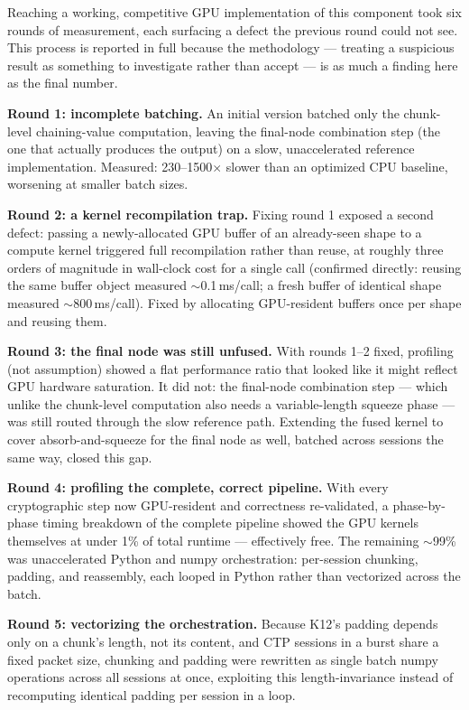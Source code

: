 \documentclass[twocolumn,10pt,journal,compsoc]{IEEEtran}
\begin{document}
Reaching a working, competitive GPU implementation of this component took six rounds of measurement, each surfacing a defect the previous round could not see. This process is reported in full because the methodology --- treating a suspicious result as something to investigate rather than accept --- is as much a finding here as the final number.

\textbf{Round 1: incomplete batching.} An initial version batched only the chunk-level chaining-value computation, leaving the final-node combination step (the one that actually produces the output) on a slow, unaccelerated reference implementation. Measured: 230--1500$\times$ slower than an optimized CPU baseline, worsening at smaller batch sizes.

\textbf{Round 2: a kernel recompilation trap.} Fixing round 1 exposed a second defect: passing a newly-allocated GPU buffer of an already-seen shape to a compute kernel triggered full recompilation rather than reuse, at roughly three orders of magnitude in wall-clock cost for a single call (confirmed directly: reusing the same buffer object measured $\sim$0.1\,ms/call; a fresh buffer of identical shape measured $\sim$800\,ms/call). Fixed by allocating GPU-resident buffers once per shape and reusing them.

\textbf{Round 3: the final node was still unfused.} With rounds 1--2 fixed, profiling (not assumption) showed a flat performance ratio that looked like it might reflect GPU hardware saturation. It did not: the final-node combination step --- which unlike the chunk-level computation also needs a variable-length squeeze phase --- was still routed through the slow reference path. Extending the fused kernel to cover absorb-and-squeeze for the final node as well, batched across sessions the same way, closed this gap.

\textbf{Round 4: profiling the complete, correct pipeline.} With every cryptographic step now GPU-resident and correctness re-validated, a phase-by-phase timing breakdown of the complete pipeline showed the GPU kernels themselves at under 1\% of total runtime --- effectively free. The remaining $\sim$99\% was unaccelerated Python and numpy orchestration: per-session chunking, padding, and reassembly, each looped in Python rather than vectorized across the batch.

\textbf{Round 5: vectorizing the orchestration.} Because K12's padding depends only on a chunk's length, not its content, and CTP sessions in a burst share a fixed packet size, chunking and padding were rewritten as single batch numpy operations across all sessions at once, exploiting this length-invariance instead of recomputing identical padding per session in a loop.
\end{document}

